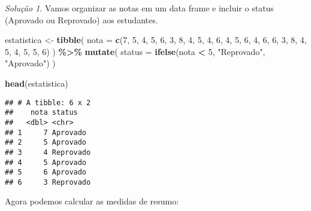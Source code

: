 \documentclass[
]{latex/krantz}
\newenvironment{Shaded}{\begin{snugshade}}{\end{snugshade}}
\newcommand{\AttributeTok}[1]{\textcolor[rgb]{0.13,0.29,0.53}{#1}}
\newcommand{\ConstantTok}[1]{\textcolor[rgb]{0.56,0.35,0.01}{#1}}
\newcommand{\DecValTok}[1]{\textcolor[rgb]{0.00,0.00,0.81}{#1}}
\newcommand{\FunctionTok}[1]{\textcolor[rgb]{0.13,0.29,0.53}{\textbf{#1}}}
\newcommand{\NormalTok}[1]{#1}
\newcommand{\OtherTok}[1]{\textcolor[rgb]{0.56,0.35,0.01}{#1}}
\newcommand{\SpecialCharTok}[1]{\textcolor[rgb]{0.81,0.36,0.00}{\textbf{#1}}}
\newcommand{\StringTok}[1]{\textcolor[rgb]{0.31,0.60,0.02}{#1}}
\theoremstyle{definition}
\theoremstyle{definition}
\theoremstyle{definition}
\theoremstyle{definition}
\theoremstyle{remark}
\newtheorem*{solution}{Solução}
\begin{document}
\begin{solution}
Vamos organizar as notas em um data frame e incluir o status (Aprovado ou Reprovado) aos estudantes.

\begin{Shaded}
\begin{Highlighting}[]
\NormalTok{estatistica }\OtherTok{\textless{}{-}} \FunctionTok{tibble}\NormalTok{(}
                  \AttributeTok{nota =} \FunctionTok{c}\NormalTok{(}\DecValTok{7}\NormalTok{, }\DecValTok{5}\NormalTok{, }\DecValTok{4}\NormalTok{, }\DecValTok{5}\NormalTok{, }\DecValTok{6}\NormalTok{, }\DecValTok{3}\NormalTok{, }\DecValTok{8}\NormalTok{, }\DecValTok{4}\NormalTok{, }\DecValTok{5}\NormalTok{, }\DecValTok{4}\NormalTok{, }\DecValTok{6}\NormalTok{, }\DecValTok{4}\NormalTok{, }\DecValTok{5}\NormalTok{, }\DecValTok{6}\NormalTok{, }\DecValTok{4}\NormalTok{, }\DecValTok{6}\NormalTok{, }\DecValTok{6}\NormalTok{, }\DecValTok{3}\NormalTok{, }\DecValTok{8}\NormalTok{, }\DecValTok{4}\NormalTok{, }\DecValTok{5}\NormalTok{, }\DecValTok{4}\NormalTok{, }\DecValTok{5}\NormalTok{, }\DecValTok{5}\NormalTok{, }\DecValTok{6}\NormalTok{)}
\NormalTok{              ) }\SpecialCharTok{\%\textgreater{}\%}
              \FunctionTok{mutate}\NormalTok{(}
                \AttributeTok{status =} \FunctionTok{ifelse}\NormalTok{(nota }\SpecialCharTok{\textless{}} \DecValTok{5}\NormalTok{, }\StringTok{"Reprovado"}\NormalTok{, }\StringTok{"Aprovado"}\NormalTok{)}
\NormalTok{              )}

\FunctionTok{head}\NormalTok{(estatistica)}
\end{Highlighting}
\end{Shaded}

\begin{verbatim}
## # A tibble: 6 x 2
##    nota status   
##   <dbl> <chr>    
## 1     7 Aprovado 
## 2     5 Aprovado 
## 3     4 Reprovado
## 4     5 Aprovado 
## 5     6 Aprovado 
## 6     3 Reprovado
\end{verbatim}

Agora podemos calcular as medidas de resumo:

\begin{Shaded}
\end{Shaded}


\end{solution}
\end{document}
